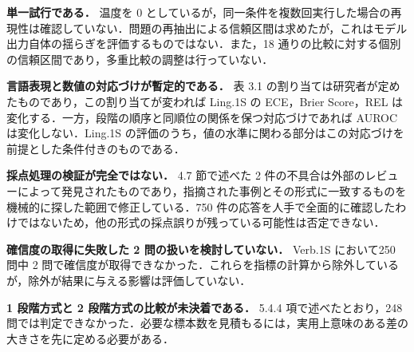 \textbf{単一試行である．} 温度を 0 としているが，同一条件を複数回実行した場合の再現性は確認していない．問題の再抽出による信頼区間は求めたが，これはモデル出力自体の揺らぎを評価するものではない．また，18 通りの比較に対する個別の信頼区間であり，多重比較の調整は行っていない．

\textbf{言語表現と数値の対応づけが暫定的である．} 表 3.1 の割り当ては研究者が定めたものであり，この割り当てが変われば Ling.1S の ECE，Brier Score，REL は変化する．一方，段階の順序と同順位の関係を保つ対応づけであれば AUROC は変化しない．Ling.1S の評価のうち，値の水準に関わる部分はこの対応づけを前提とした条件付きのものである．

\textbf{採点処理の検証が完全ではない．} 4.7 節で述べた 2 件の不具合は外部のレビューによって発見されたものであり，指摘された事例とその形式に一致するものを機械的に探した範囲で修正している．750 件の応答を人手で全面的に確認したわけではないため，他の形式の採点誤りが残っている可能性は否定できない．

\textbf{確信度の取得に失敗した 2 問の扱いを検討していない．} Verb.1S において250 問中 2 問で確信度が取得できなかった．これらを指標の計算から除外しているが，除外が結果に与える影響は評価していない．

\textbf{1 段階方式と 2 段階方式の比較が未決着である．} 5.4.4 項で述べたとおり，248 問では判定できなかった．必要な標本数を見積もるには，実用上意味のある差の大きさを先に定める必要がある．

